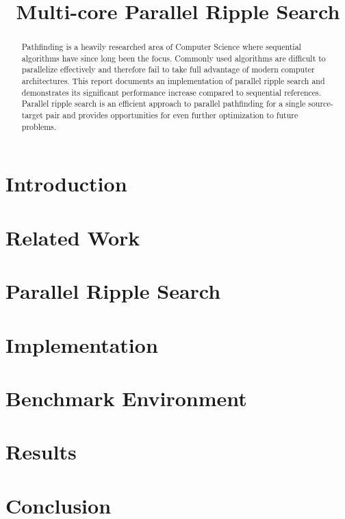 \documentclass[letterpaper]{article}
\title{Multi-core Parallel Ripple Search}
\begin{document}
%
\maketitle
%

\begin{abstract}
Pathfinding is a heavily researched area of Computer Science where sequential algorithms have since long been the focus.
Commonly used algorithms are difficult to parallelize effectively and therefore fail to take full advantage of modern computer architectures.
This report documents an implementation of parallel ripple search and demonstrates its significant performance increase compared to sequential references.
Parallel ripple search is an efficient approach to parallel pathfinding for a single source-target pair and provides opportunities for even further optimization to future problems.
\end{abstract}

\section{Introduction}\label{sec:intro}


\section{Related Work}\label{sec:relatedwork}


\section{Parallel Ripple Search}\label{sec:ripplesearch}


\section{Implementation}\label{sec:implementation}


\section{Benchmark Environment}\label{sec:experimental}


\section{Results}


\section{Conclusion}




\end{document}
